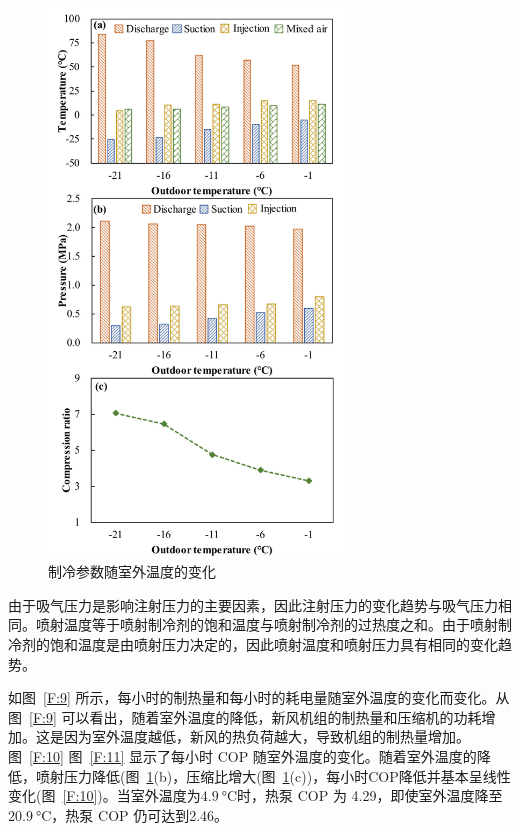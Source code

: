 \begin{figure}
	\centering
	\includegraphics[width=0.7\textwidth]{figure/figure_8}
	\caption{制冷参数随室外温度的变化}
	\label{F:8}
\end{figure}

由于吸气压力是影响注射压力的主要因素，因此注射压力的变化趋势与吸气压力相同。喷射温度等于喷射制冷剂的饱和温度与喷射制冷剂的过热度之和。由于喷射制冷剂的饱和温度是由喷射压力决定的，因此喷射温度和喷射压力具有相同的变化趋势。

如图~\ref{F:9} 所示，每小时的制热量和每小时的耗电量随室外温度的变化而变化。从图~\ref{F:9} 可以看出，随着室外温度的降低，新风机组的制热量和压缩机的功耗增加。这是因为室外温度越低，新风的热负荷越大，导致机组的制热量增加。图~\ref{F:10} 图~\ref{F:11} 显示了每小时 COP 随室外温度的变化。随着室外温度的降低，喷射压力降低(图~\ref{F:8}(b)，压缩比增大(图~\ref{F:8}(c))，每小时COP降低并基本呈线性变化(图~\ref{F:10})。当室外温度为$\qty{4.9}{\degreeCelsius} $时，热泵 COP 为 4.29，即使室外温度降至$\qty{20.9}{\degreeCelsius} $，热泵 COP 仍可达到2.46。

